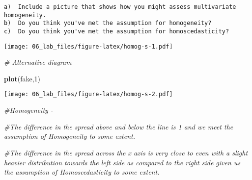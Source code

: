 \documentclass[
]{article}
\newenvironment{Shaded}{\begin{snugshade}}{\end{snugshade}}
\newcommand{\CommentTok}[1]{\textcolor[rgb]{0.56,0.35,0.01}{\textit{#1}}}
\newcommand{\DataTypeTok}[1]{\textcolor[rgb]{0.13,0.29,0.53}{#1}}
\newcommand{\DecValTok}[1]{\textcolor[rgb]{0.00,0.00,0.81}{#1}}
\newcommand{\KeywordTok}[1]{\textcolor[rgb]{0.13,0.29,0.53}{\textbf{#1}}}
\newcommand{\NormalTok}[1]{#1}
\newcommand{\OperatorTok}[1]{\textcolor[rgb]{0.81,0.36,0.00}{\textbf{#1}}}
\newcommand{\StringTok}[1]{\textcolor[rgb]{0.31,0.60,0.02}{#1}}
\begin{document}
\begin{verbatim}
a)  Include a picture that shows how you might assess multivariate homogeneity.
b)  Do you think you've met the assumption for homogeneity?
c)  Do you think you've met the assumption for homoscedasticity?
\end{verbatim}

\begin{Shaded}
\end{Shaded}

\texttt{[image: 06\_lab\_files/figure-latex/homog-s-1.pdf]}

\begin{Shaded}
\begin{Highlighting}[]
\CommentTok{# Alternative diagram}

\KeywordTok{plot}\NormalTok{(fake,}\DecValTok{1}\NormalTok{)}
\end{Highlighting}
\end{Shaded}

\texttt{[image: 06\_lab\_files/figure-latex/homog-s-2.pdf]}

\begin{Shaded}
\begin{Highlighting}[]
\CommentTok{#Homogeneity - }

\CommentTok{#The difference in the spread above and below the line is 1 and we meet the assumption of Homogeneity to some extent.}

\CommentTok{#The difference in the spread across the x axis is very close to even with a slight heavier distribution towards the left side as compared to the right side given us the assumption of Homoscedasticity to some extent.}
\end{Highlighting}
\end{Shaded}
\end{document}
